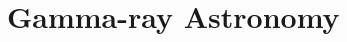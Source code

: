 \chapter{Gamma-ray Astronomy }
\label{chap:gamAstr}

\begin{figure}[h!]%
	\centering
\end{figure}






